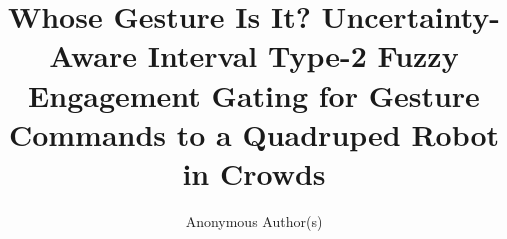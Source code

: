 \documentclass[runningheads]{llncs}
\begin{document}
\title{Whose Gesture Is It? Uncertainty-Aware Interval Type-2 Fuzzy
Engagement Gating for Gesture Commands to a Quadruped Robot in Crowds}

\author{Anonymous Author(s)}

\maketitle














\end{document}
